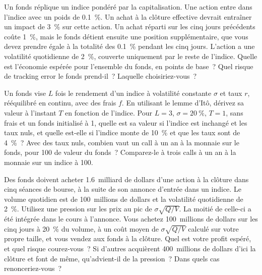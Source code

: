 \begin{question}\label{iq:iv2:etfs-futures-and-index-arbitrage:33}
Un fonds réplique un indice pondéré par la capitalisation. Une action entre dans l'indice avec un poids de 0.1~\%. Un achat à la clôture effective devrait entraîner un impact de 3~\% sur cette action. Un achat réparti sur les cinq jours précédents coûte 1~\%, mais le fonds détient ensuite une position supplémentaire, que vous devez prendre égale à la totalité des 0.1~\% pendant les cinq jours. L'action a une volatilité quotidienne de 2~\%, couverte uniquement par le reste de l'indice. Quelle est l'économie espérée pour l'ensemble du fonds, en points de base~? Quel risque de tracking error le fonds prend-il~? Laquelle choisiriez-vous~?
\end{question}

\begin{question}\label{iq:iv2:etfs-futures-and-index-arbitrage:34}
Un fonds vise $L$ fois le rendement d'un indice à volatilité constante $\sigma$ et taux $r$, rééquilibré en continu, avec des frais $f$. En utilisant le lemme d'Itô, dérivez sa valeur à l'instant $T$ en fonction de l'indice. Pour $L = 3$, $\sigma = 20~\%$, $T = 1$, sans frais et un fonds initialisé à 1, quelle est sa valeur si l'indice est inchangé et les taux nuls, et quelle est-elle si l'indice monte de 10~\% et que les taux sont de 4~\%~? Avec des taux nuls, combien vaut un call à un an à la monnaie sur le fonds, pour 100 de valeur du fonds~? Comparez-le à trois calls à un an à la monnaie sur un indice à 100.
\end{question}

\begin{question}\label{iq:iv2:etfs-futures-and-index-arbitrage:35}
Des fonds doivent acheter 1.6~milliard de dollars d'une action à la clôture dans cinq séances de bourse, à la suite de son annonce d'entrée dans un indice. Le volume quotidien est de 100~millions de dollars et la volatilité quotidienne de 2~\%. Utilisez une pression sur les prix au pic de $\sigma\sqrt{Q/V}$. La moitié de celle-ci a été intégrée dans le cours à l'annonce. Vous achetez 100~millions de dollars sur les cinq jours à 20~\% du volume, à un coût moyen de $\sigma\sqrt{Q/V}$ calculé sur votre propre taille, et vous vendez aux fonds à la clôture. Quel est votre profit espéré, et quel risque courez-vous~? Si d'autres acquièrent 400~millions de dollars d'ici la clôture et font de même, qu'advient-il de la pression~? Dans quels cas renonceriez-vous~?
\end{question}
